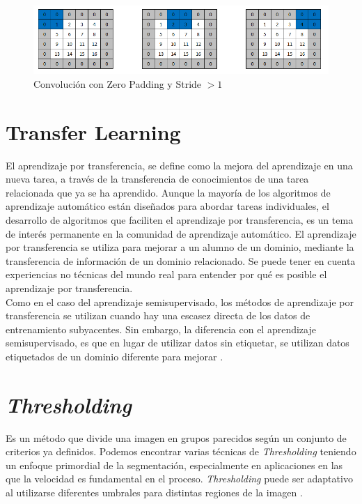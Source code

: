 \begin{figure}[ht]
	\centering
	\includegraphics[scale=0.5]{Figs/stride.png}
	\caption{Convolución con Zero Padding y Stride $> 1$}
	\label{stride}
\end{figure}

\newpage
\section{Transfer Learning}
El aprendizaje por transferencia, se define como la mejora del aprendizaje en una nueva tarea, a través de la transferencia de conocimientos de una tarea relacionada que ya se ha aprendido. Aunque la mayoría de los algoritmos de aprendizaje automático están diseñados para abordar tareas individuales, el desarrollo de algoritmos que faciliten el aprendizaje por transferencia, es un tema de interés permanente en la comunidad de aprendizaje automático. El aprendizaje por transferencia se utiliza para mejorar a un alumno de un dominio, mediante la transferencia de información de un dominio relacionado. Se puede tener en cuenta experiencias no técnicas del mundo real para entender por qué es posible el aprendizaje por transferencia.\\

Como en el caso del aprendizaje semisupervisado, los métodos de aprendizaje por transferencia se utilizan cuando hay una escasez directa de los datos de entrenamiento subyacentes. Sin embargo, la diferencia con el aprendizaje semisupervisado, es que en lugar de utilizar datos sin etiquetar, se utilizan datos etiquetados de un dominio diferente para mejorar \cite{ref_14}.

\section{\textit{Thresholding}}


Es un método que divide una imagen en grupos parecidos según un conjunto de criterios ya definidos. Podemos encontrar varias técnicas de \textit{Thresholding} teniendo un enfoque primordial de la segmentación, especialmente en aplicaciones en las que la velocidad es fundamental en el proceso. \textit{Thresholding} puede ser adaptativo al utilizarse diferentes umbrales para distintas regiones de la imagen \cite{kulkarni2012color}.


